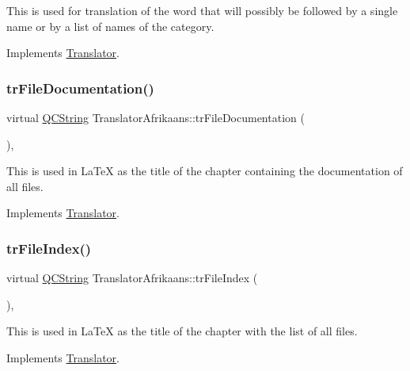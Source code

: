 This is used for translation of the word that will possibly be followed by a single name or by a list of names of the category. 

Implements \mbox{\hyperlink{class_translator}{Translator}}.

\mbox{\label{class_translator_afrikaans_a85987e9fa41b4daa6790876127cda212}} 
\subsubsection{\texorpdfstring{trFileDocumentation()}{trFileDocumentation()}}
{\footnotesize\ttfamily virtual \mbox{\hyperlink{class_q_c_string}{Q\+C\+String}} Translator\+Afrikaans\+::tr\+File\+Documentation (\begin{DoxyParamCaption}{ }\end{DoxyParamCaption})\hspace{0.3cm}{\ttfamily [inline]}, {\ttfamily [virtual]}}

This is used in La\+TeX as the title of the chapter containing the documentation of all files. 

Implements \mbox{\hyperlink{class_translator}{Translator}}.

\mbox{\label{class_translator_afrikaans_aa2c982a3bdff6ea6ce5eef6ed0906b81}} 
\subsubsection{\texorpdfstring{trFileIndex()}{trFileIndex()}}
{\footnotesize\ttfamily virtual \mbox{\hyperlink{class_q_c_string}{Q\+C\+String}} Translator\+Afrikaans\+::tr\+File\+Index (\begin{DoxyParamCaption}{ }\end{DoxyParamCaption})\hspace{0.3cm}{\ttfamily [inline]}, {\ttfamily [virtual]}}

This is used in La\+TeX as the title of the chapter with the list of all files. 

Implements \mbox{\hyperlink{class_translator}{Translator}}.

